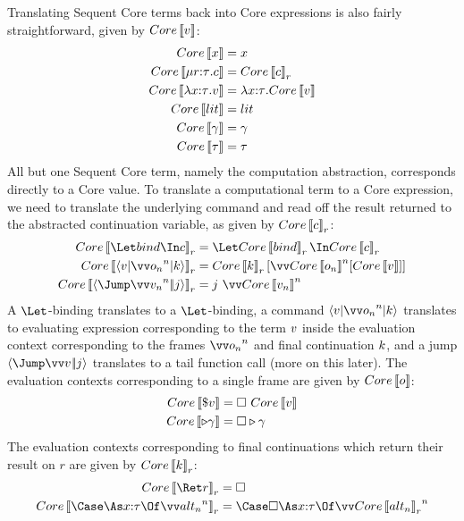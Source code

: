 \documentclass{article}
\begin{document}
Translating Sequent Core terms back into Core expressions is also fairly
straightforward, given by $Core\left\llbracket{v}\right\rrbracket$:
\begin{align*}
  Core\left\llbracket{x}\right\rrbracket &= x
  \\
  Core\left\llbracket{\mu{r{:}{\tau}}. c}\right\rrbracket &= Core\left\llbracket{c}\right\rrbracket_{r}
  \\
  Core\left\llbracket{\lambda{x{:}{\tau}}.v}\right\rrbracket &= \lambda{x{:}{\tau}}.Core\left\llbracket{v}\right\rrbracket
  \\
  Core\left\llbracket{lit}\right\rrbracket &= lit
  \\
  Core\left\llbracket{\gamma}\right\rrbracket &= \gamma
  \\
  Core\left\llbracket{\tau}\right\rrbracket &= \tau
\end{align*}
All but one Sequent Core term, namely the computation abstraction, corresponds
directly to a Core value.  To translate a computational term to a Core
expression, we need to translate the underlying command and read off the result
returned to the abstracted continuation variable, as given by
$Core\left\llbracket{c}\right\rrbracket_{r}$:
\begin{align*}
  Core\trans{\Let \abind \In \cmd}_{r}
  &=
  \Let Core\trans{\abind}_{r} \In Core\trans{\cmd}_{r}
  \\
  Core\trans{\braket{\tm | \vect[n]{\frm_n} | \ko}}_{r}
  &=
  Core\trans{\ko}_{r}[\vect[n]{Core\trans{\frm_n}}[Core\trans{\tm}]]
  \\
  Core\trans{\jump{\vect[n]{\tm_n}}{j}}_{r}
  &=
  j ~ \vect[n]{Core\trans{\tm_n}}
\end{align*}
A $\Let$-binding translates to a $\Let$-binding, a command
$\braket{\tm|\vect[n]{\frm_n}|\ko}$ translates to evaluating expression
corresponding to the term $v$ inside the evaluation context corresponding to
the frames $\vect[n]{\frm_n}$ and final continuation $k$, and a jump
$\jump{\vect{\tm}}{j}$ translates to a tail function call (more on this later).
The evaluation contexts corresponding to a single frame are given by
$Core\left\llbracket{o}\right\rrbracket$:
\begin{align*}
  Core\left\llbracket{\${v}}\right\rrbracket &= \square ~ Core\left\llbracket{v}\right\rrbracket
  \\
  Core \left\llbracket{\triangleright{\gamma}}\right\rrbracket &= {\square}\triangleright{\gamma}
\end{align*}
The evaluation contexts corresponding to final continuations which return their
result on $r$ are given by $Core\left\llbracket{k}\right\rrbracket_{r}$:
\begin{align*}
  Core\trans{\ret r}_{r} &= \hole
  \\
  Core\trans{\caseas{\ann x \ty}{\vect[n]{\analt_n}}}_{r}
  &=
  \Case \hole \As \ann x \ty \Of \vect[n]{Core\trans{\analt_n}_{r}}
\end{align*}
\end{document}
